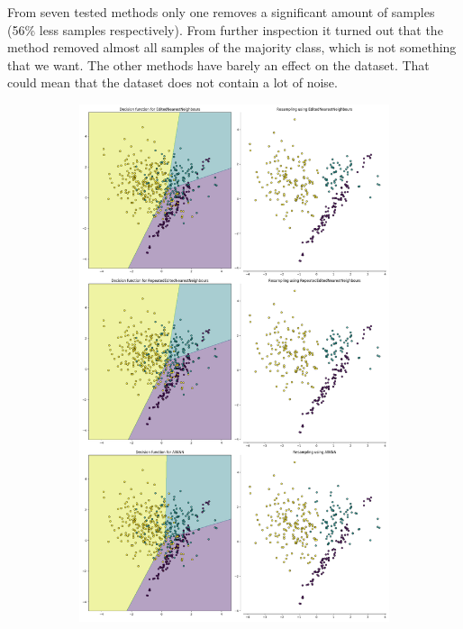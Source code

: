 From seven tested methods only one removes a significant amount of samples (56\% less samples respectively). From further inspection it turned out that the method removed almost all samples of the majority class, which is not something that we want. The other methods have barely an effect on the dataset. That could mean that the dataset does not contain a lot of noise.

\begin{figure}[H]
	\begin{subfigure}{0.5\textwidth}
		\centering
		\includegraphics[scale=0.2]{./src/under_sampling_ex.png}
	\end{subfigure}%

\end{figure}
